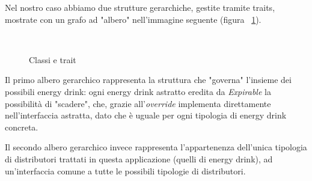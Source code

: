 Nel nostro caso abbiamo due strutture gerarchiche, gestite tramite traits, mostrate con un grafo ad "albero" nell'immagine seguente (figura ~\ref{fig:classi&traits}).

\begin{figure}[h]
	\centering
	 \quad
	 \\
	 \quad
	\caption{Classi e trait}
	\label{fig:classi&traits}
\end{figure}

Il primo albero gerarchico rappresenta la struttura che "governa" l'insieme dei possibili energy drink: ogni energy drink astratto eredita da \textit{Expirable} la possibilità di "scadere", che, grazie all'\textit{override} implementa direttamente nell'interfaccia astratta, dato che è uguale per ogni tipologia di energy drink concreta.

Il secondo albero gerarchico invece rappresenta l'appartenenza dell'unica tipologia di distributori trattati in questa applicazione (quelli di energy drink), ad un'interfaccia comune a tutte le possibili tipologie di distributori.

